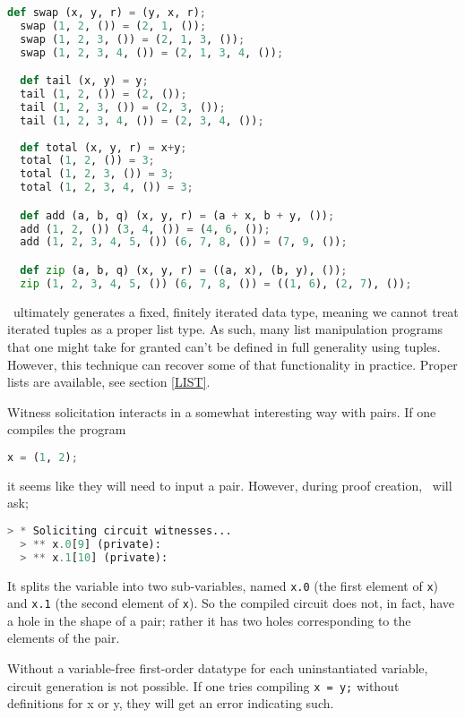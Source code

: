 \begin{lstlisting}[language=Python]
  def swap (x, y, r) = (y, x, r);
  swap (1, 2, ()) = (2, 1, ());
  swap (1, 2, 3, ()) = (2, 1, 3, ());
  swap (1, 2, 3, 4, ()) = (2, 1, 3, 4, ());

  def tail (x, y) = y;
  tail (1, 2, ()) = (2, ());
  tail (1, 2, 3, ()) = (2, 3, ());  
  tail (1, 2, 3, 4, ()) = (2, 3, 4, ());
  
  def total (x, y, r) = x+y;
  total (1, 2, ()) = 3;
  total (1, 2, 3, ()) = 3;  
  total (1, 2, 3, 4, ()) = 3;

  def add (a, b, q) (x, y, r) = (a + x, b + y, ());
  add (1, 2, ()) (3, 4, ()) = (4, 6, ());
  add (1, 2, 3, 4, 5, ()) (6, 7, 8, ()) = (7, 9, ());

  def zip (a, b, q) (x, y, r) = ((a, x), (b, y), ());
  zip (1, 2, 3, 4, 5, ()) (6, 7, 8, ()) = ((1, 6), (2, 7), ());
\end{lstlisting}

\vampir\ ultimately generates a fixed, finitely iterated data type, meaning we cannot treat iterated tuples as a proper list type. As such, many list manipulation programs that one might take for granted can't be defined in full generality using tuples. However, this technique can recover some of that functionality in practice. Proper lists are available, see section \ref{LIST}.

Witness solicitation interacts in a somewhat interesting way with pairs. If one compiles the program

\begin{lstlisting}[language=Python]
  x = (1, 2);
\end{lstlisting}

it seems like they will need to input a pair. However, during proof creation, \vampir\ will ask;

\begin{lstlisting}[language=Python]
  > * Soliciting circuit witnesses...
  > ** x.0[9] (private): 
  > ** x.1[10] (private): 
\end{lstlisting}

It splits the variable into two sub-variables, named \lstinline{x.0} (the first element of \lstinline{x}) and \lstinline{x.1} (the second element of \lstinline{x}). So the compiled circuit does not, in fact, have a hole in the shape of a pair; rather it has two holes corresponding to the elements of the pair.

Without a variable-free first-order datatype for each uninstantiated variable, circuit generation is not possible. If one tries compiling \lstinline{x = y;} without definitions for x or y, they will get an error indicating such.



